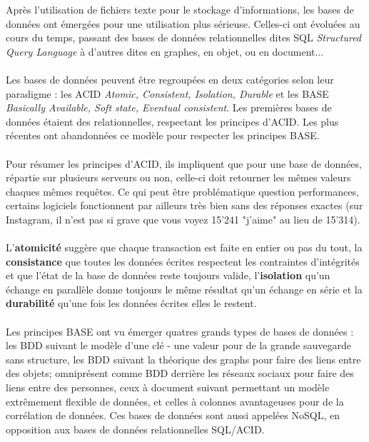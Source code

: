 Après l'utilisation de fichiers texte pour le stockage d'informations, les bases de données ont émergées pour une utilisation plus sérieuse. Celles-ci ont évoluées au cours du temps, passant des bases de données relationnelles dites SQL \textit{Structured Query Language} à d'autres dites en graphes, en objet, ou en document...
\\ \\
Les bases de données peuvent être regroupées en deux catégories selon leur paradigme : les ACID \textit{Atomic, Consistent, Isolation, Durable} et les BASE \textit{Basically Available, Soft state, Eventual consistent}. Les premières bases de données étaient des relationnelles, respectant les principes d'ACID. Les plus récentes ont abandonnées ce modèle pour respecter les principes BASE.
\\ \\
Pour résumer les principes d'ACID, ils impliquent que pour une base de données, répartie sur plusieurs serveurs ou non, celle-ci doit retourner les mêmes valeurs chaques mêmes requêtes. Ce qui peut être problématique question performances, certains logiciels fonctionnent par ailleurs très bien sans des réponses exactes (sur Instagram, il n'est pas si grave que vous voyez 15'241 "j'aime" au lieu de 15'314).
\\ \\
L'\textbf{atomicité} suggère que chaque transaction est faite en entier ou pas du tout, la \textbf{consistance} que toutes les données écrites respectent les contraintes d’intégrités et que l’état de la base de données reste toujours valide, l'\textbf{isolation} qu'un échange en parallèle donne toujours le même résultat qu’un échange en série et la \textbf{durabilité} qu'une fois les données écrites elles le restent.
\\ \\
Les principes BASE ont vu émerger quatres grands types de bases de données : les BDD suivant le modèle d'une clé - une valeur pour de la grande sauvegarde sans structure, les BDD suivant la théorique des graphs pour faire des liens entre des objets; omniprésent comme BDD derrière les réseaux sociaux pour faire des liens entre des personnes, ceux à document suivant permettant un modèle extrêmement flexible de données, et celles à colonnes avantageuses pour de la corrélation de données. Ces bases de données sont aussi appelées NoSQL, en opposition aux bases de données relationnelles SQL/ACID.
\\
